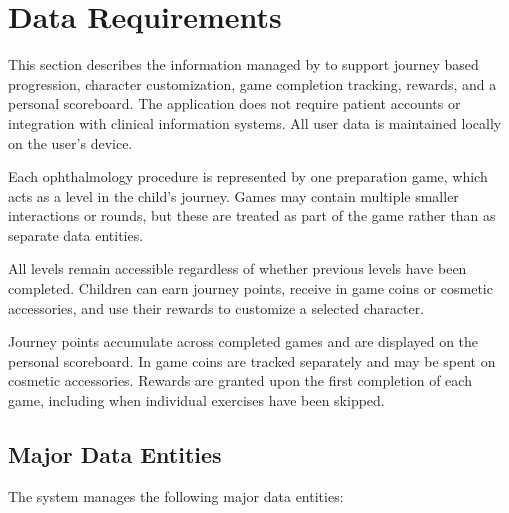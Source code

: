 \documentclass[12pt]{article}
\begin{document}

\section{Data Requirements}
\label{sec_Data_Requirements}

This section describes the information managed by \progname{}
to support journey based progression, character customization,
game completion tracking, rewards, and a personal scoreboard.
The application does not require patient accounts or
integration with clinical information systems. All user
data is maintained locally on the user's device.

Each ophthalmology procedure is represented by one
preparation game, which acts as a level in the child's
journey. Games may contain multiple smaller interactions
or rounds, but these are treated as part of the game
rather than as separate data entities.

All levels remain accessible regardless of whether previous
levels have been completed. Children can earn journey points,
receive in game coins or cosmetic accessories, and use
their rewards to customize a selected character.

Journey points accumulate across completed games and are
displayed on the personal scoreboard. In game coins are
tracked separately and may be spent on cosmetic accessories.
Rewards are granted upon the first completion of each game,
including when individual exercises have been skipped.


\subsection{Major Data Entities}

The system manages the following major data entities:
\end{document}
